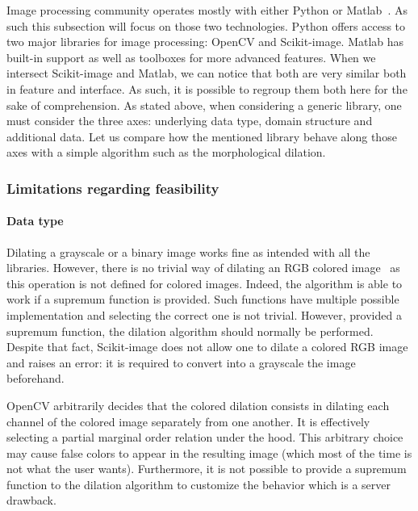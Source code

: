 Image processing community operates mostly with either Python or Matlab~\parencite{etter.2002.introduction}. As such
this subsection will focus on those two technologies. Python offers access to two major libraries for image processing:
OpenCV and Scikit-image. Matlab has built-in support as well as toolboxes for more advanced features. When we intersect
Scikit-image and Matlab, we can notice that both are very similar both in feature and interface. As such, it is possible
to regroup them both here for the sake of comprehension. As stated above, when considering a generic library, one must
consider the three axes: underlying data type, domain structure and additional data. Let us compare how the mentioned
library behave along those axes with a simple algorithm such as the morphological dilation.

\subsubsection{Limitations regarding feasibility}

\paragraph{Data type} Dilating a grayscale or a binary image works fine as intended with all the libraries. However,
there is no trivial way of dilating an RGB colored image~\parencite{angulo.2007.morpho_color,dewitte.2005.morpho_color}
as this operation is not defined for colored images. Indeed, the algorithm is able to work if a supremum function is
provided. Such functions have multiple possible implementation and selecting the correct one is not trivial. However,
provided a supremum function, the dilation algorithm should normally be performed. Despite that fact, Scikit-image does
not allow one to dilate a colored RGB image and raises an error: it is required to convert into a grayscale the image
beforehand.

OpenCV arbitrarily decides that the colored dilation consists in dilating each channel of the colored image separately
from one another. It is effectively selecting a partial marginal order relation under the hood. This arbitrary choice
may cause false colors to appear in the resulting image (which most of the time is not what the user wants).
Furthermore, it is not possible to provide a supremum function to the dilation algorithm to customize the behavior which
is a server drawback.

